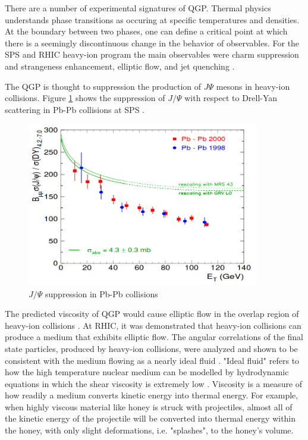 There are a number of experimental signatures of QGP. Thermal physics understands phase transitions as occuring at specific temperatures and densities. At the boundary between two phases, one can define a critical point at which there is a seemingly discontinuous change in the behavior of observables. For the SPS and RHIC heavy-ion program the main observables were charm suppression and strangeness enhancement, elliptic flow, and jet quenching \cite{Gyulassy:1990ye}\cite{Matsui:1986dk}\cite{Margetis:2000sv}.

The QGP is thought to suppression the production of $J\Psi$ mesons in heavy-ion collisions. Figure \ref{fig:jpsiSupp} shows the suppression of $J/\Psi$ with respect to Drell-Yan scattering in Pb-Pb collisions at SPS \cite{spsHI}.
\begin{figure}[h!]
\begin{centering}
\includegraphics[width=4in]{Chapter1/importfigs/jpsiSupp.png}
\par\end{centering}
\caption{$J/\Psi$ suppression in Pb-Pb collisions \cite{spsHI} \label{fig:jpsiSupp}}
\end{figure}

The predicted viscosity of QGP would cause elliptic flow in the overlap region of heavy-ion collisions \cite{phobosFlow}. At RHIC, it was demonstrated that heavy-ion collisions can produce a medium that exhibits elliptic flow. The angular correlations of the final state particles, produced by heavy-ion collisions, were analyzed and shown to be consistent with the medium flowing as a nearly ideal fluid \cite{Chatrchyan:2013nka}. "Ideal fluid" refers to how the high temperature nuclear medium can be modelled by hydrodynamic equations in which the shear viscosity is extremely low \cite{Karsch:2000kv}. Viscosity is a measure of how readily a medium converts kinetic energy into thermal energy. For example, when highly viscous material like honey is struck with projectiles, almost all of the kinetic energy of the projectile will be converted into thermal energy within the honey, with only slight deformations, i.e. "splashes", to the honey's volume. 

